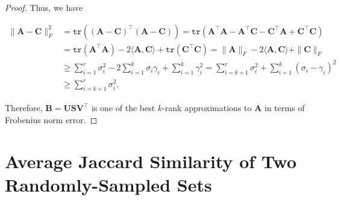 \documentclass{article}
\newcommand{\bd}[1]{\boldsymbol{#1}}
\begin{document}
\begin{proof}
    \hspace{1.3em}
    Thus, we have 

    \vspace{-2em}
    \begin{align*}
        \|\bd{A}-\bd{C}\|_F^2 & = \mathtt{tr}\left(\left(\bd{A}-\bd{C}\right)^\top\left(\bd{A}-\bd{C}\right)\right) = \mathtt{tr}\left(\bd{A}^\top\bd{A}-\bd{A}^\top\bd{C}-\bd{C}^\top\bd{A}+\bd{C}^\top\bd{C}\right) \\
        & = \mathtt{tr}\left(\bd{A}^\top\bd{A}\right) - 2\langle \bd{A}, \bd{C} \rangle + \mathtt{tr}\left(\bd{C}^\top\bd{C}\right) = \|\bd{A}\|_F - 2\langle\bd{A},\bd{C}\rangle + \|\bd{C}\|_F \\
        &\geq \sum_{i=1}^r \sigma_i^2 - 2\sum_{i=1}^k \sigma_i\gamma_i + \sum_{i=1}^k \gamma_i^2 = \sum_{i=k+1}^r \sigma_i^2 + \sum_{i=1}^k \left(\sigma_i-\gamma_i\right)^2 \\
        & \geq \sum_{i=k+1}^r \sigma_i^2.
    \end{align*}

    \hspace{1.3em}
    Therefore, $\bd{B} = \bd{U} \bd{S} \bd{V}^\top$ is one of the best $k$-rank approximations to $\bd{A}$ in terms of Frobenius norm error.
\end{proof}


\vspace{1em}
\section{Average Jaccard Similarity of Two Randomly-Sampled Sets}
\vspace{1em}
\end{document}
